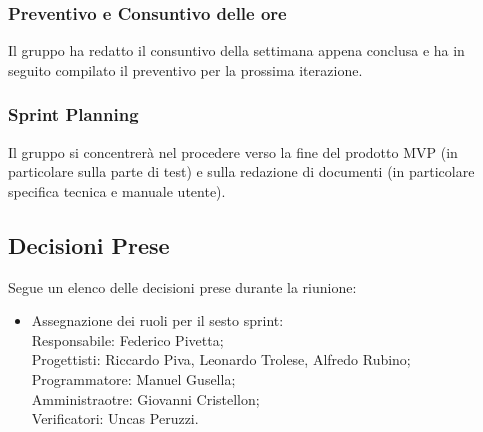 \documentclass[10pt]{article}
\begin{document}
\subsubsection{Preventivo e Consuntivo delle ore}
Il gruppo ha redatto il consuntivo della settimana appena conclusa e ha in seguito compilato il preventivo per la prossima iterazione.

\subsubsection{Sprint Planning}
Il gruppo si concentrerà nel procedere verso la fine del prodotto MVP (in particolare sulla parte di test) e sulla redazione di documenti (in particolare specifica tecnica e manuale utente).

\subsection{Decisioni Prese}
Segue un elenco delle decisioni prese durante la riunione:
\begin{itemize}
    \item   Assegnazione dei ruoli per il sesto sprint:\\
            Responsabile: Federico Pivetta;\\
            Progettisti: Riccardo Piva, Leonardo Trolese, Alfredo Rubino;\\
            Programmatore: Manuel Gusella;\\
            Amministraotre: Giovanni Cristellon;\\
            Verificatori: Uncas Peruzzi.
\end{itemize}
\end{document}
